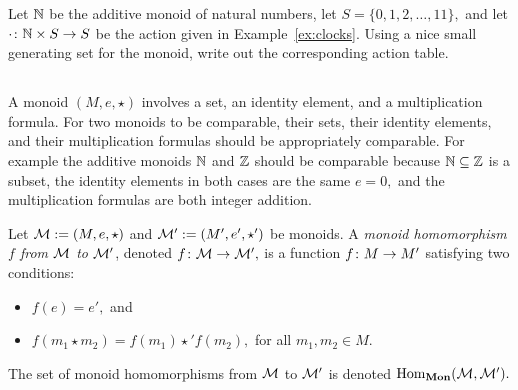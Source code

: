 \documentclass[CT4S-EN-RU]{subfiles}
\begin{document}
\begin{exampleRUS}\label{ex:multiplication table}
\end{exampleRUS}

\begin{exerciseENG}
Let ${\mathbb N}$ be the additive monoid of natural numbers, let $S=\{0,1,2,\ldots,11\},$ and let $\cdot\colon{\mathbb N}\times S\rightarrow S$ be the action given in Example~\ref{ex:clocks}. Using a nice small generating set for the monoid, write out the corresponding action table.
\end{exerciseENG}

\begin{exerciseRUS}
\end{exerciseRUS}


\subsection{}

\begin{blockENG}
A monoid $(M,e,\star)$ involves a set, an identity element, and a multiplication formula. For two monoids to be comparable, their sets, their identity elements, and their multiplication formulas should be appropriately comparable. For example the additive monoids ${\mathbb N}$ and ${\mathbb Z}$ should be comparable because ${\mathbb N}\subseteq{\mathbb Z}$ is a subset, the identity elements in both cases are the same $e=0,$ and the multiplication formulas are both integer addition.
\end{blockENG}

\begin{definitionENG}\label{def:monoid hom}
Let $\mathcal{M}:=(M,e,\star)$ and $\mathcal{M}':=(M',e',\star')$ be monoids. A {\em monoid homomorphism $f$ from $\mathcal{M}$ to $\mathcal{M}'$}, denoted $f\colon\mathcal{M}\rightarrow\mathcal{M}',$ is a function $f\colon M\rightarrow M'$ satisfying two conditions:
\begin{itemize}
\item $f(e)=e',$ and
\item $f(m_1\star m_2)=f(m_1)\star'f(m_2),$ for all $m_1,m_2\in M.$
\end{itemize}
The set of monoid homomorphisms from $\mathcal{M}$ to $\mathcal{M}'$ is denoted $\textnormal{Hom}_{{\mathbf{Mon}}}(\mathcal{M},\mathcal{M}').$
\end{definitionENG}

\begin{definitionRUS}\label{def:monoid hom}
\end{definitionRUS}
\end{document}
